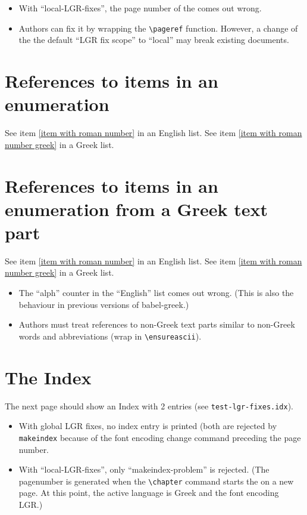 \documentclass[a4paper,oneside]{book}
\begin{document}

\begin{itemize}
\item With ``local-LGR-fixes'', the page number of the 
      comes out wrong.
\item Authors can fix it by wrapping the \verb|\pageref| function.
      However, a change of the the default ``LGR fix scope'' to ``local''
      may break existing documents.
\end{itemize}


\section{References to items in an enumeration}

See item \ref{item with roman number} in an English list.
See item \ref{item with roman number greek} in a Greek list.

\section{References to items in an enumeration from a Greek text part}


See item \ref{item with roman number} in an English list.
See item \ref{item with roman number greek} in a Greek list.


\begin{itemize}
\item The ``alph'' counter in the ``English'' list comes out wrong.
      (This is also the behaviour in previous versions of babel-greek.)
\item Authors must treat references to non-Greek text parts similar to
      non-Greek words and abbreviations (wrap in \verb|\ensureascii|).
\end{itemize}

\section{The Index}

The next page should show an Index with 2 entries
(see \texttt{test-lgr-fixes.idx}).

\begin{itemize}
\item With global LGR fixes, no index entry is printed (both are rejected by
      \texttt{makeindex} because of the font encoding change command
      preceding the page number.
\item With ``local-LGR-fixes'', only ``makeindex-problem'' is rejected.
      (The pagenumber is generated when the \verb|\chapter| command starts
      the  on a new page. At this point, the active
      language is Greek and the font encoding LGR.)
\end{itemize}

\backmatter
\printindex
\end{document}
